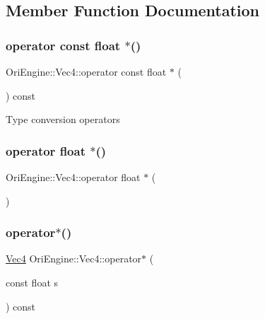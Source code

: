 \subsection{Member Function Documentation}
\hypertarget{struct_ori_engine_1_1_vec4_a51a4a0aa30a09d5de4a38925d230c847}{}\label{struct_ori_engine_1_1_vec4_a51a4a0aa30a09d5de4a38925d230c847} 
\subsubsection{\texorpdfstring{operator const float $\ast$()}{operator const float *()}}
{\footnotesize\ttfamily Ori\+Engine\+::\+Vec4\+::operator const float $\ast$ (\begin{DoxyParamCaption}{ }\end{DoxyParamCaption}) const\hspace{0.3cm}{\ttfamily [inline]}}

Type conversion operators \hypertarget{struct_ori_engine_1_1_vec4_a9f1df44372c5cfb62e42741684bff87d}{}\label{struct_ori_engine_1_1_vec4_a9f1df44372c5cfb62e42741684bff87d} 
\subsubsection{\texorpdfstring{operator float $\ast$()}{operator float *()}}
{\footnotesize\ttfamily Ori\+Engine\+::\+Vec4\+::operator float $\ast$ (\begin{DoxyParamCaption}{ }\end{DoxyParamCaption})\hspace{0.3cm}{\ttfamily [inline]}}

\hypertarget{struct_ori_engine_1_1_vec4_adbd1dee1fe6d1ebc4b9f72a66b8de0b6}{}\label{struct_ori_engine_1_1_vec4_adbd1dee1fe6d1ebc4b9f72a66b8de0b6} 
\subsubsection{\texorpdfstring{operator$\ast$()}{operator*()}}
{\footnotesize\ttfamily \hyperlink{struct_ori_engine_1_1_vec4}{Vec4} Ori\+Engine\+::\+Vec4\+::operator$\ast$ (\begin{DoxyParamCaption}\item[{const float}]{s }\end{DoxyParamCaption}) const\hspace{0.3cm}{\ttfamily [inline]}}



